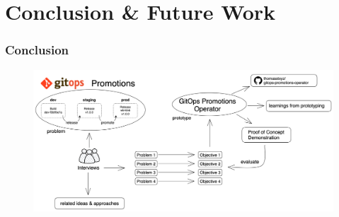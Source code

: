 \documentclass{beamer}
\begin{document}
\section{Conclusion \& Future Work}

\begin{frame}
\frametitle{Conclusion}

\begin{figure}[h]
	\centering
	\includegraphics[width=1.0\linewidth]{assets/overview-empirical-work.png}
	\label{fig:conclusion-gitops-thesis-2}	
\end{figure}

	
\end{frame}
\end{document}
